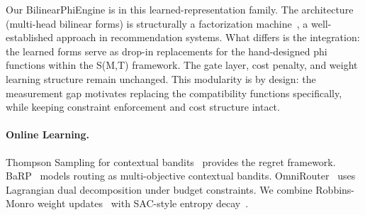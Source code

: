 Our BilinearPhiEngine is in this learned-representation family. The architecture (multi-head bilinear forms) is structurally a factorization machine~\citep{rendle2010factorization}, a well-established approach in recommendation systems. What differs is the integration: the learned forms serve as drop-in replacements for the hand-designed phi functions within the S(M,T) framework. The gate layer, cost penalty, and weight learning structure remain unchanged. This modularity is by design: the measurement gap motivates replacing the compatibility functions specifically, while keeping constraint enforcement and cost structure intact.

\paragraph{Online Learning.}
Thompson Sampling for contextual bandits~\citep{agrawal2013thompson} provides the regret framework. BaRP~\citep{barp2025} models routing as multi-objective contextual bandits. OmniRouter~\citep{mei2025omnirouter} uses Lagrangian dual decomposition under budget constraints. We combine Robbins-Monro weight updates~\citep{robbins1951stochastic} with SAC-style entropy decay~\citep{haarnoja2018sac}.
